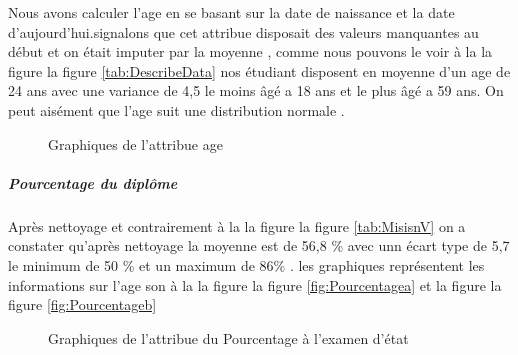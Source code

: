 Nous avons calculer l'age en se basant sur la date de naissance et la date d'aujourd'hui.signalons que cet attribue disposait des valeurs manquantes au début et on était imputer par la moyenne , comme nous pouvons le voir à la la figure la figure \ref{tab:DescribeData}  nos étudiant disposent en moyenne d'un age de 24 ans avec une variance de 4,5 le moins âgé a 18 ans et le plus âgé a 59 ans.
On peut aisément que l'age suit une distribution normale . 
\begin{figure}[!htbp]
	\centering
	\hfill
	\hfill
	\caption{Graphiques de l'attribue age}
\end{figure}
\subparagraph{Pourcentage du diplôme}
Après nettoyage et contrairement à la la figure la figure \ref{tab:MisisnV} on a constater qu'après nettoyage la moyenne est de 56,8 \% avec unn écart type de 5,7 le minimum de 50 \% et un maximum de 86\% .
les graphiques représentent les informations sur l'age  son à la la figure la figure \ref{fig:Pourcentagea} et la figure la figure \ref{fig:Pourcentageb}
\begin{figure}[!htbp]
	\centering
	\hfill
	\hfill
	\caption{Graphiques de l'attribue du Pourcentage à l'examen d'état }
\end{figure}
